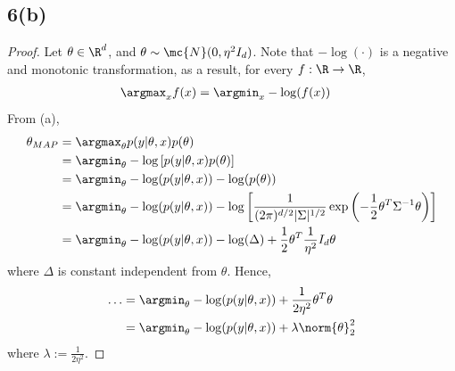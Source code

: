 \documentclass[11pt]{article}
\begin{document}
	\newpage
	\subsection{6(b)}
	\begin{proof}
		Let $\theta \in \R^d$, and $\theta \sim \mc{N}(0, \eta^2 I_d)$.
		Note that $-\log(\cdot)$ is a negative and monotonic transformation, as a result, for every $f: \R \to \R$,
		\begin{align}
			\argmax_x f(x) &= \argmin_x - \log(f(x))
		\end{align}
		From (a),
		\begin{align}
			\theta_{MAP} &= \argmax_\theta p(y|\theta, x) p(\theta) \\
			&= \argmin_\theta - \log \left[p(y|\theta, x) p(\theta) \right] \\
			&= \argmin_\theta - \log(p(y|\theta, x)) - \log(p(\theta)) \\
			&= \argmin_\theta - \log(p(y|\theta, x)) - \log \left[
			\frac{1}{(2\pi)^{d/2} |\Sigma|^{1/2}} \exp \left (
			- \frac{1}{2} \theta^T \Sigma^{-1} \theta
			\right )
			\right ] \\
			&= \argmin_\theta - \log(p(y|\theta, x)) - \log (\Delta) + \frac{1}{2} \theta^T \frac{1}{\eta^2} I_d \theta
		\end{align}
		where $\Delta$ is constant independent from $\theta$. Hence,
		\begin{align}
			\dots &= \argmin_\theta - \log(p(y|\theta, x)) + \frac{1}{2 \eta^2} \theta^T \theta \\
			&= \argmin_\theta - \log(p(y|\theta, x)) + \lambda \norm{\theta}_2^2
		\end{align}
		where $\lambda := \frac{1}{2 \eta^2}$.
	\end{proof}
	
	\newpage
\end{document}
